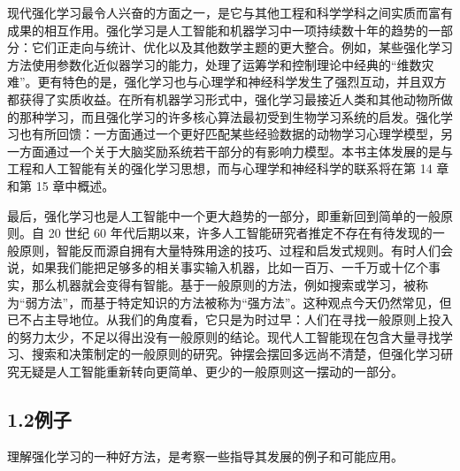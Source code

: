 \documentclass[UTF8,12pt,a4paper,fontset=fandol]{ctexart}
\begin{document}
现代强化学习最令人兴奋的方面之一，是它与其他工程和科学学科之间实质而富有成果的相互作用。强化学习是人工智能和机器学习中一项持续数十年的趋势的一部分：它们正走向与统计、优化以及其他数学主题的更大整合。例如，某些强化学习方法使用参数化近似器学习的能力，处理了运筹学和控制理论中经典的“维数灾难”。更有特色的是，强化学习也与心理学和神经科学发生了强烈互动，并且双方都获得了实质收益。在所有机器学习形式中，强化学习最接近人类和其他动物所做的那种学习，而且强化学习的许多核心算法最初受到生物学习系统的启发。强化学习也有所回馈：一方面通过一个更好匹配某些经验数据的动物学习心理学模型，另一方面通过一个关于大脑奖励系统若干部分的有影响力模型。本书主体发展的是与工程和人工智能有关的强化学习思想，而与心理学和神经科学的联系将在第 14 章和第 15 章中概述。

最后，强化学习也是人工智能中一个更大趋势的一部分，即重新回到简单的一般原则。自 20 世纪 60 年代后期以来，许多人工智能研究者推定不存在有待发现的一般原则，智能反而源自拥有大量特殊用途的技巧、过程和启发式规则。有时人们会说，如果我们能把足够多的相关事实输入机器，比如一百万、一千万或十亿个事实，那么机器就会变得有智能。基于一般原则的方法，例如搜索或学习，被称为“弱方法”，而基于特定知识的方法被称为“强方法”。这种观点今天仍然常见，但已不占主导地位。从我们的角度看，它只是为时过早：人们在寻找一般原则上投入的努力太少，不足以得出没有一般原则的结论。现代人工智能现在包含大量寻找学习、搜索和决策制定的一般原则的研究。钟摆会摆回多远尚不清楚，但强化学习研究无疑是人工智能重新转向更简单、更少的一般原则这一摆动的一部分。

\subsection*{1.2\quad 例子}

理解强化学习的一种好方法，是考察一些指导其发展的例子和可能应用。
\end{document}
